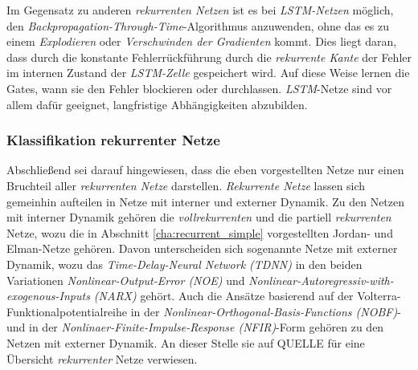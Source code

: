 Im Gegensatz zu anderen \textit{rekurrenten Netzen} ist es bei \textit{LSTM-Netzen} möglich, den \textit{Backpropagation-Through-Time}-Algorithmus anzuwenden, ohne das es zu einem \textit{Explodieren} oder \textit{Verschwinden der Gradienten} kommt. Dies liegt daran, dass durch die konstante Fehlerrückführung durch die \textit{rekurrente Kante} der Fehler im internen Zustand der \textit{LSTM-Zelle} gespeichert wird.  Auf diese Weise lernen die Gates, wann sie den Fehler blockieren oder durchlassen. \textit{LSTM}-Netze sind vor allem dafür geeignet, langfristige Abhängigkeiten abzubilden. \cite{Lipton.5292015}

\subsubsection{Klassifikation rekurrenter Netze}

Abschließend sei darauf hingewiesen, dass die eben vorgestellten Netze nur einen Bruchteil aller \textit{rekurrenten Netze} darstellen. \textit{Rekurrente Netze} lassen sich gemeinhin aufteilen in Netze mit interner und externer Dynamik. Zu den Netzen mit interner Dynamik gehören die \textit{vollrekurrenten} und die partiell \textit{rekurrenten} Netze, wozu die in Abschnitt \ref{cha:recurrent_simple} vorgestellten Jordan- und Elman-Netze gehören. Davon unterscheiden sich sogenannte Netze mit externer Dynamik, wozu das \textit{Time-Delay-Neural Network (TDNN)} in den beiden Variationen \textit{Nonlinear-Output-Error (NOE)} und \textit{Nonlinear-Autoregressiv-with-exogenous-Inputs (NARX)} gehört. Auch die Ansätze basierend auf der Volterra-Funktionalpotentialreihe in der \textit{Nonlinear-Orthogonal-Basis-Functions (NOBF)}- und in der \textit{Nonlinaer-Finite-Impulse-Response (NFIR)}-Form gehören zu den Netzen mit externer Dynamik. An dieser Stelle sie auf QUELLE für eine Übersicht \textit{rekurrenter} Netze verwiesen.















   
 
 
 
